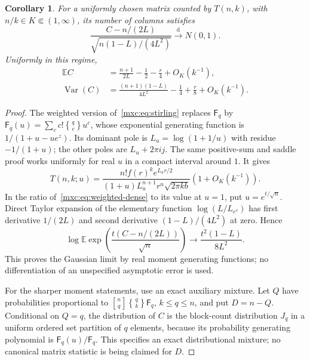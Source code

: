 \documentclass[11pt]{article}
\numberwithin{equation}{section}
\newtheorem{corollary}[theorem]{Corollary}
\theoremstyle{definition}
\theoremstyle{remark}
\newcommand{\E}{\mathbb E}
\newcommand{\StirOne}[2]{\genfrac{[}{]}{0pt}{}{#1}{#2}}
\newcommand{\StirTwo}[2]{\genfrac{\{} {\}}{0pt}{}{#1}{#2}}
\DeclareMathOperator{\Var}{Var}
\begin{document}
\begin{corollary}\label{mxc:cor:dense-columns}
For a uniformly chosen matrix counted by $T(n,k)$, with
$n/k\in K\Subset(1,\infty)$, its number of columns satisfies
\begin{equation}\label{mxc:eq:dense-column-clt}
 \frac{C-n/(2L)}{\sqrt{n(1-L)/(4L^2)}}
       \xrightarrow{\mathrm d}N(0,1).
\end{equation}
Uniformly in this regime,
\begin{align}
 \E C&=\frac{n+1}{2L}-\frac12-\frac r4+O_K(k^{-1}),
 \label{mxc:eq:dense-column-mean}\\
 \Var(C)&=\frac{(n+1)(1-L)}{4L^2}-\frac14+\frac r8+O_K(k^{-1}).
 \label{mxc:eq:dense-column-variance}
\end{align}
\end{corollary}
\begin{proof}
The weighted version of~\eqref{mxc:eq:stirling} replaces $\mathsf F_q$
by $\mathsf F_q(u)=\sum_c c!\StirTwo{q}{c}u^c$, whose exponential
generating function is $1/(1+u-u e^z)$. Its dominant pole is
$L_u=\log(1+1/u)$ with residue $-1/(1+u)$; the other poles are
$L_u+2\pi i j$. The same positive-sum and saddle proof works
uniformly for real $u$ in a compact interval around $1$. It gives
\begin{equation}\label{mxc:eq:weighted-dense}
 T(n,k;u)=\frac{n! f(r)^k e^{L_ur/2}}
 {(1+u)L_u^{n+1}r^n\sqrt{2\pi k b}}(1+O_K(k^{-1})).
\end{equation}
In the ratio of~\eqref{mxc:eq:weighted-dense} to its value at $u=1$,
put $u=e^{t/\sqrt n}$. Direct Taylor expansion of the elementary
function $\log(L/L_{e^v})$ has first derivative $1/(2L)$ and
second derivative $(1-L)/(4L^2)$ at zero. Hence
\[
 \log\E\exp\left(\frac{t(C-n/(2L))}{\sqrt n}\right)
       \longrightarrow\frac{t^2(1-L)}{8L^2}.
\]
This proves the Gaussian limit by real moment generating functions;
no differentiation of an unspecified asymptotic error is used.

For the sharper moment statements, use an exact auxiliary mixture.
Let $Q$ have probabilities proportional to
$\StirOne{n}{q}\StirTwo{q}{k}\mathsf F_q$, $k\le q\le n$, and
put $D=n-Q$. Conditional on $Q=q$, the distribution of $C$ is the
block-count distribution $J_q$ in a uniform ordered set partition of
$q$ elements, because its probability generating polynomial is
$\mathsf F_q(u)/\mathsf F_q$. This specifies an exact distributional
mixture; no canonical matrix statistic is being claimed for $D$.


\end{proof}
\end{document}
